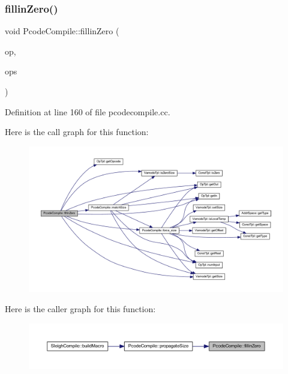 \subsubsection{\texorpdfstring{fillinZero()}{fillinZero()}}
{\footnotesize\ttfamily void Pcode\+Compile\+::fillin\+Zero (\begin{DoxyParamCaption}\item[{\mbox{\hyperlink{class_op_tpl}{Op\+Tpl}} $\ast$}]{op,  }\item[{const vector$<$ \mbox{\hyperlink{class_op_tpl}{Op\+Tpl}} $\ast$ $>$ \&}]{ops }\end{DoxyParamCaption})\hspace{0.3cm}{\ttfamily [static]}}



Definition at line 160 of file pcodecompile.\+cc.

Here is the call graph for this function\+:
\nopagebreak
\begin{figure}[H]
\begin{center}
\leavevmode
\includegraphics[width=350pt]{class_pcode_compile_a7844bb12a59ed9998354ed9328e18f90_cgraph}
\end{center}
\end{figure}
Here is the caller graph for this function\+:
\nopagebreak
\begin{figure}[H]
\begin{center}
\leavevmode
\includegraphics[width=350pt]{class_pcode_compile_a7844bb12a59ed9998354ed9328e18f90_icgraph}
\end{center}
\end{figure}
\mbox{\label{class_pcode_compile_a620eb9c557b3c38ff57f958211065938}} 
